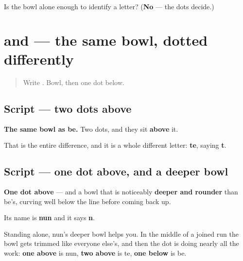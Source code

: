 \begin{tcolorbox}[breakable,colback=teal!4,colframe=teal!35!black,title={Before you move on}]
Is the bowl alone enough to identify a letter? (\textbf{No} — the dots decide.)
\end{tcolorbox}
\section[\texorpdfstring{\fa{ت} \fa{ن} (te, nun)}{ت ن (te, nun)}]{ and  — the same bowl, dotted differently}

\label{lesson:FA-W15-te-nun}



\begin{quote}
Write . Bowl, then one dot below.
\end{quote}

\subsection*{Script — two dots above}

\begin{quote}
\end{quote}

\textbf{The same bowl as be.} Two dots, and they sit \textbf{above} it.

That is the entire difference, and it is a whole different letter: \textbf{te}, saying \textbf{t}.

\subsection*{Script — one dot above, and a deeper bowl}
\begin{quote}
\end{quote}

\textbf{One dot above} — and a bowl that is noticeably \textbf{deeper and rounder} than be's, curving well below the line before coming back up.

Its name is \textbf{nun} and it says \textbf{n}.

Standing alone, nun's deeper bowl helps you. In the middle of a joined run the bowl gets trimmed like everyone else's, and then the dot is doing nearly all the work: \textbf{one above} is nun, \textbf{two above} is te, \textbf{one below} is be.

